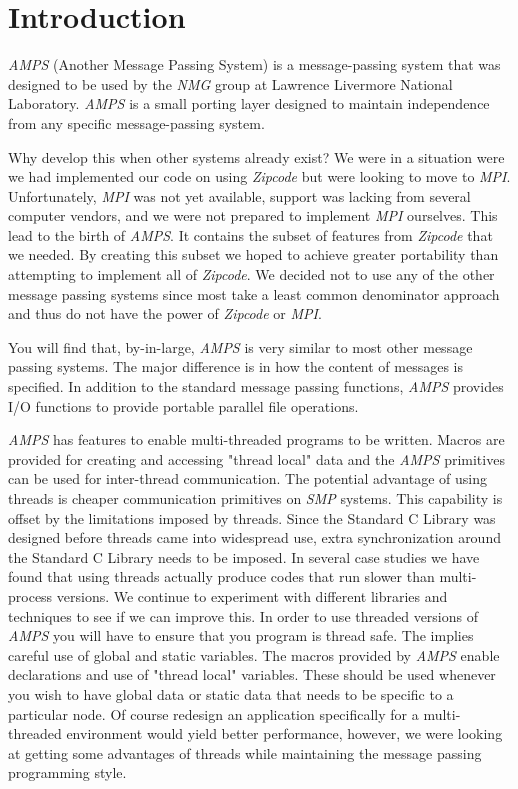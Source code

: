 
\chapter{Introduction}
\label{Introduction}

{\em AMPS} (Another Message Passing System) is a message-passing system
that was designed to be used by the {\em NMG} group at Lawrence
Livermore National Laboratory.  {\em AMPS} is a small porting layer
designed to maintain independence from any specific message-passing
system.

Why develop this when other systems already exist?  We were in a
situation were we had implemented our code on using {\em Zipcode}
\cite{SkLe90,skjellum.smith.ea.93,smith.falgout.ea.93} but
were looking to move to {\em MPI}.  Unfortunately, {\em MPI} was not
yet available, support was lacking from several computer vendors, and we
were not prepared to implement {\em MPI} ourselves.  This lead to the
birth of {\em AMPS}.  It contains the subset of features from
{\em Zipcode} that we needed.  By creating this subset we hoped to
achieve greater portability than attempting to implement all of
{\em Zipcode}.  We decided not to use any of the other message passing
systems since most take a least common denominator approach and thus do
not have the power of {\em Zipcode} or {\em MPI}.

You will find that, by-in-large, {\em AMPS} is very similar to most
other message passing systems.  The major difference is in how the
content of messages is specified.  In addition to the standard message
passing functions, {\em AMPS} provides I/O functions to provide
portable parallel file operations.

{\em AMPS} has features to enable multi-threaded programs to be
written.  Macros are provided for creating and accessing "thread local"
data and the {\em AMPS} primitives can be used for inter-thread
communication.  The potential advantage of using threads is cheaper
communication primitives on {\em SMP} systems.  This capability is
offset by the limitations imposed by threads.  Since the Standard C
Library was designed before threads came into widespread use, extra
synchronization around the Standard C Library needs to be imposed.  In
several case studies we have found that using threads actually produce
codes that run slower than multi-process versions.  We continue to
experiment with different libraries and techniques to see if we can
improve this.  In order to use threaded versions of {\em AMPS} you will
have to ensure that you program is thread safe.  The implies careful
use of global and static variables.  The macros provided by {\em AMPS}
enable declarations and use of "thread local" variables.  These should
be used whenever you wish to have global data or static data that needs
to be specific to a particular node.  Of course redesign an application
specifically for a multi-threaded environment would yield better
performance, however, we were looking at getting some advantages of
threads while maintaining the message passing programming style.

